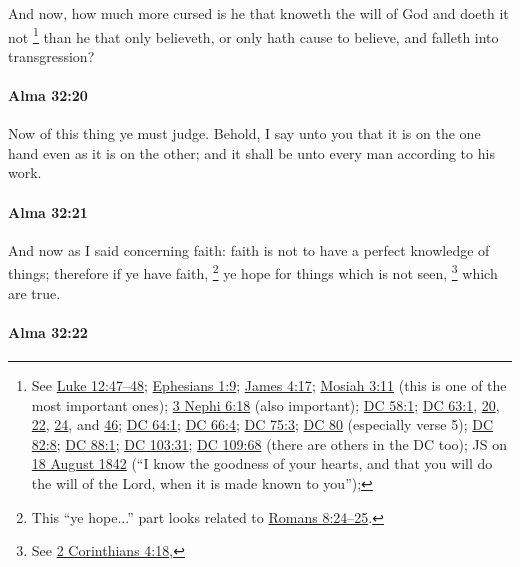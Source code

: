 			And now, how much more cursed is he
			that knoweth the will of God and doeth it not%
				\footnote{%
					See \hyperref[LUKE-12-47]{Luke 12:47--48}; \hyperref[EPHESIANS-1-9]{Ephesians 1:9}; \hyperref[JAMES-4-17]{James 4:17}; \hyperref[MOSIAH-3-11]{Mosiah 3:11} (this is one of the most important ones); \hyperref[3NEPHI-6-18]{3 Nephi 6:18} (also important); \hyperref[DC58-1]{DC 58:1}; \hyperref[DC63-1]{DC 63:1}, \hyperref[DC63-20]{20}, \hyperref[DC63-22]{22}, \hyperref[DC63-24]{24}, and \hyperref[DC63-46]{46}; \hyperref[DC64-1]{DC 64:1}; \hyperref[DC66-4]{DC 66:4}; \hyperref[DC75-3]{DC 75:3}; \hyperref[DC80]{DC 80}  (especially verse 5); \hyperref[DC82-8]{DC 82:8}; \hyperref[DC88-1]{DC 88:1}; \hyperref[DC103-31]{DC 103:31}; \hyperref[DC109-68]{DC 109:68} (there are others in the DC too); JS on \hyperref[EMS-1842-JS-18-AUG-1842]{18 August 1842} (``I know the goodness of your hearts, and that you will do the will of the Lord, when it is made known to you''); 
					}
			than he that only believeth, or only hath cause to believe,
			and falleth into transgression?

		\paragraph{Alma 32:20} %
			\label{ALMA-32-20}

			Now of this thing ye must judge.
			Behold, I say unto you that it is on the one hand even as it is on the other;
			and it shall be unto every man according to his work.

		\paragraph{Alma 32:21} %
			\label{ALMA-32-21}

			And now as I said concerning faith:
			faith is not to have a perfect knowledge of things;
			therefore if ye have faith,
			\footnote{%
				This ``ye hope...'' part looks related to \hyperref[ROMANS-8-24]{Romans 8:24--25}.
				}%
			ye hope for things which is not seen,%
				\footnote{%
					See \hyperref[2CORINTHIANS-4-18]{2 Corinthians 4:18},
					}
			which are true.

		\paragraph{Alma 32:22} %
			\label{ALMA-32-22}

